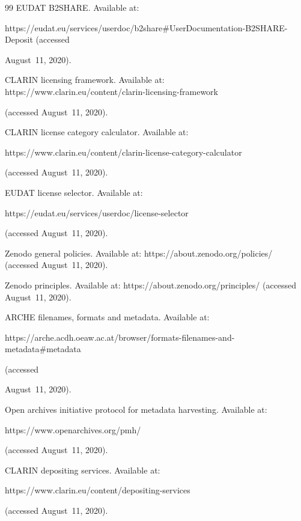 {{\begin{thebibliography}{99}
EUDAT B2SHARE. Available at:

{\sf https://eudat.eu/services/userdoc/b2share\#User\linebreak Documentation-B2SHARE-Deposit} (accessed 

August~11, 2020).


CLARIN licensing framework. Available at: {\sf https://www.clarin.eu/content/clarin-licensing-framework} 

(accessed August~11, 2020).


CLARIN license category calculator. Available at: {\sf  

https://www.clarin.eu/content/\linebreak clarin-license-category-calculator} (accessed August~11, 2020).


EUDAT license selector. Available at: {\sf 

https://eudat.eu/services/userdoc/license-selector} (accessed August~11, 2020).


Zenodo general policies. Available at: {\sf https://about.zenodo.org/policies/} (accessed August~11, 2020).


Zenodo principles. Available at: {\sf https://about.zenodo.org/principles/} (accessed August~11, 2020).


ARCHE filenames, formats and metadata. Available at: {\sf 

https://arche.acdh.oeaw.ac.\linebreak at/browser/formats-filenames-and-metadata\#metadata} (accessed 

August~11, 2020).


Open archives initiative protocol for metadata harvesting. Available at: {\sf 

https://\linebreak www.openarchives.org/pmh/} (accessed August~11, 2020).


CLARIN depositing services. Available at: {\sf 

https://www.clarin.eu/content/\linebreak depositing-services} (accessed August~11, 2020).


\end{thebibliography}}}
